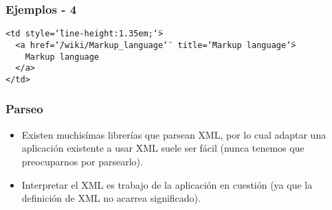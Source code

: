 \newcommand{\dquote}{\texttt{\char`\"}}

\begin{frame}
\frametitle{Ejemplos - 4}
\footnotesize
\texttt{<td style=\dquote line-height:1.35em;\dquote>		\\
	~~<a href=\dquote /wiki/Markup\_language\dquote ~
		title=\dquote Markup language\dquote>		\\
	~~~~Markup language					\\
	~~</a>							\\
	</td>
}
\end{frame}

\begin{frame}
\frametitle{Parseo}
\begin{itemize}
	\item	Existen muchisímas librerías que parsean XML, por lo cual
		adaptar una aplicación existente a usar XML suele ser fácil
		(nunca tenemos que preocuparnos por parsearlo).
		\pause

	\item	Interpretar el XML es trabajo de la aplicación en cuestión
		(ya que la definición de XML no acarrea significado).
\end{itemize}
\end{frame}
